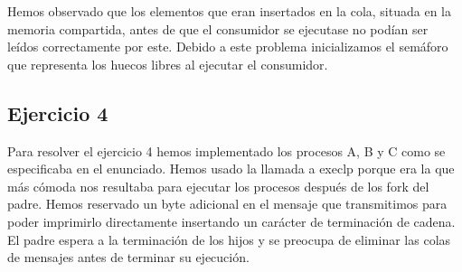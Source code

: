 \documentclass[]{article}
\begin{document}
Hemos observado que los elementos que eran insertados en la cola, situada en la memoria compartida, antes de que el consumidor se ejecutase no podían ser leídos correctamente por este. Debido a este problema inicializamos el semáforo
que representa los huecos libres al ejecutar el consumidor.

\subsection*{Ejercicio 4}
Para resolver el ejercicio 4 hemos implementado los procesos A, B y C como se especificaba en el enunciado. Hemos usado la llamada a execlp porque era la que más cómoda nos resultaba para ejecutar los procesos después de los fork del padre. Hemos reservado un byte adicional en el mensaje que transmitimos para poder imprimirlo directamente insertando un carácter de terminación de cadena.
\\

 El padre espera a la terminación de los hijos y se preocupa de eliminar las colas de mensajes antes de terminar su ejecución.
\end{document}
